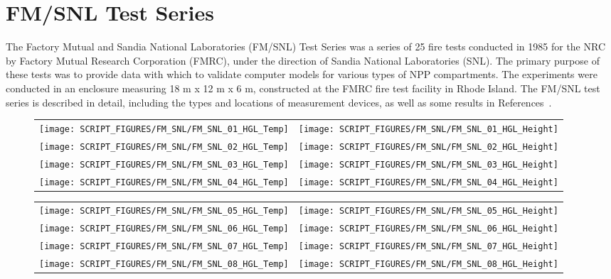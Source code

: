 \clearpage

\section{FM/SNL Test Series}

The Factory Mutual and Sandia National Laboratories (FM/SNL) Test Series was a series of 25 fire tests conducted in 1985 for the NRC by Factory Mutual Research Corporation (FMRC), under the direction of Sandia National Laboratories (SNL).  The primary purpose of these tests was to provide data with which to validate computer models for various types of NPP compartments.  The experiments were conducted in an enclosure measuring 18 m x 12 m x 6 m, constructed at the FMRC fire test facility in Rhode Island.  The FM/SNL test series is described in detail, including the types and locations of measurement devices, as well as some results in References~\cite{Nowlen:NUREG4681,Nowlen:NUREG4527}.

\begin{figure}[p]
\begin{tabular*}{\textwidth}{l@{\extracolsep{\fill}}r}
\texttt{[image: SCRIPT\_FIGURES/FM\_SNL/FM\_SNL\_01\_HGL\_Temp]} &
\texttt{[image: SCRIPT\_FIGURES/FM\_SNL/FM\_SNL\_01\_HGL\_Height]} \\
\texttt{[image: SCRIPT\_FIGURES/FM\_SNL/FM\_SNL\_02\_HGL\_Temp]} &
\texttt{[image: SCRIPT\_FIGURES/FM\_SNL/FM\_SNL\_02\_HGL\_Height]} \\
\texttt{[image: SCRIPT\_FIGURES/FM\_SNL/FM\_SNL\_03\_HGL\_Temp]} &
\texttt{[image: SCRIPT\_FIGURES/FM\_SNL/FM\_SNL\_03\_HGL\_Height]} \\
\texttt{[image: SCRIPT\_FIGURES/FM\_SNL/FM\_SNL\_04\_HGL\_Temp]} &
\texttt{[image: SCRIPT\_FIGURES/FM\_SNL/FM\_SNL\_04\_HGL\_Height]}
\end{tabular*}
\end{figure}

\begin{figure}[p]
\begin{tabular*}{\textwidth}{l@{\extracolsep{\fill}}r}
\texttt{[image: SCRIPT\_FIGURES/FM\_SNL/FM\_SNL\_05\_HGL\_Temp]} &
\texttt{[image: SCRIPT\_FIGURES/FM\_SNL/FM\_SNL\_05\_HGL\_Height]} \\\texttt{[image: SCRIPT\_FIGURES/FM\_SNL/FM\_SNL\_06\_HGL\_Temp]} &
\texttt{[image: SCRIPT\_FIGURES/FM\_SNL/FM\_SNL\_06\_HGL\_Height]} \\
\texttt{[image: SCRIPT\_FIGURES/FM\_SNL/FM\_SNL\_07\_HGL\_Temp]} &
\texttt{[image: SCRIPT\_FIGURES/FM\_SNL/FM\_SNL\_07\_HGL\_Height]} \\
\texttt{[image: SCRIPT\_FIGURES/FM\_SNL/FM\_SNL\_08\_HGL\_Temp]} &
\texttt{[image: SCRIPT\_FIGURES/FM\_SNL/FM\_SNL\_08\_HGL\_Height]}
\end{tabular*}
\end{figure}

